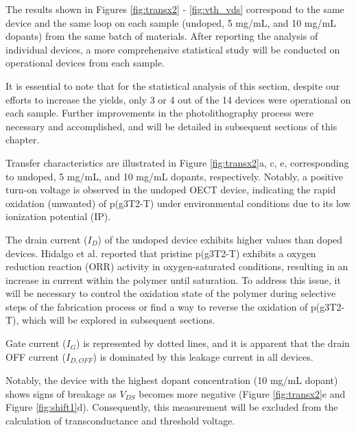The results shown in Figures \ref{fig:transx2} - \ref{fig:vth_vds} correspond to the same device and the same loop on each sample (undoped, 5 mg/mL, and 10 mg/mL dopants) from the same batch of materials. After reporting the analysis of individual devices, a more comprehensive statistical study will be conducted on operational devices from each sample. 

It is essential to note that for the statistical analysis of this section, despite our efforts to increase the yields, only 3 or 4 out of the 14 devices were operational on each sample. Further improvements in the photolithography process were necessary and accomplished, and will be detailed in subsequent sections of this chapter. 

Transfer characteristics are illustrated in Figure \ref{fig:transx2}a, c, e, corresponding to undoped, 5 mg/mL, and 10 mg/mL dopants, respectively. Notably, a positive turn-on voltage is observed in the undoped OECT device, indicating the rapid oxidation (unwanted) of p(g3T2-T) under environmental conditions due to its low ionization potential (IP). 

The drain current ($I_{D}$) of the undoped device exhibits higher values than doped devices. Hidalgo et al.  \cite{hidalgocastilloSimultaneousPerformanceStability2022a} reported that pristine p(g3T2-T) exhibits a oxygen reduction reaction (ORR) activity in oxygen-saturated conditions, resulting in an increase in current within the polymer until saturation. To address this issue, it will be necessary to control the oxidation state of the polymer during selective steps of the fabrication process or find a way to reverse the oxidation of p(g3T2-T), which will be explored in subsequent sections.

Gate current ($I_{G}$) is represented by dotted lines, and it is apparent that the drain OFF current ($I_{D,OFF}$) is dominated by this leakage current in all devices. %

Notably, the device with the highest dopant concentration (10 mg/mL dopant) shows signs of breakage as $V_{DS}$ becomes more negative (Figure \ref{fig:transx2}e and Figure \ref{fig:shift1}d). Consequently, this measurement will be excluded from the calculation of transconductance and threshold voltage.


